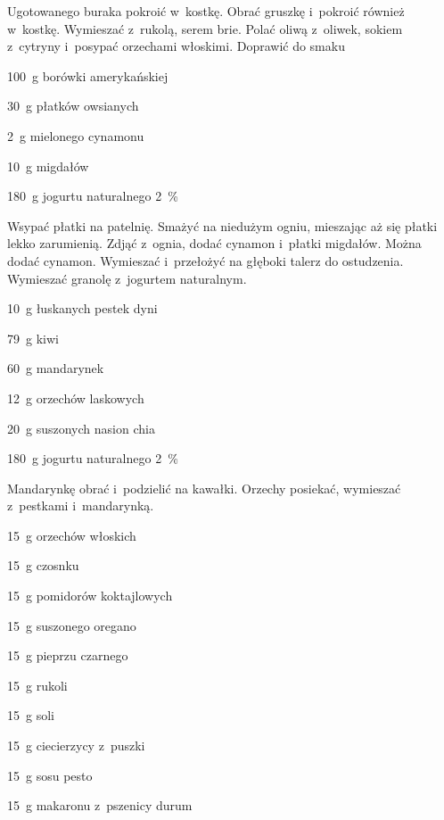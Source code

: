 \documentclass[../main.tex]{subfiles}
\begin{document}
Ugotowanego buraka pokroić w~kostkę. Obrać gruszkę i~pokroić również w~kostkę.
Wymieszać z~rukolą, serem brie. Polać oliwą z~oliwek, sokiem z~cytryny
i~posypać orzechami włoskimi. Doprawić do smaku


\begin{Ingred}
    \item \qty{100}{\gram} borówki amerykańskiej
    \item \qty{30}{\gram} płatków owsianych
    \item \qty{2}{\gram} mielonego cynamonu
    \item \qty{10}{\gram} migdałów
    \item \qty{180}{\gram} jogurtu naturalnego \qty{2}{\percent}
\end{Ingred}

Wsypać płatki na patelnię. Smażyć na niedużym ogniu, mieszając aż się płatki
lekko zarumienią. Zdjąć z~ognia, dodać cynamon i~płatki migdałów. Można dodać
cynamon. Wymieszać i~przełożyć na głęboki talerz do ostudzenia. Wymieszać
granolę z~jogurtem naturalnym.


\begin{Ingred}
    \item \qty{10}{\gram} łuskanych pestek dyni
    \item \qty{79}{\gram} kiwi
    \item \qty{60}{\gram} mandarynek
    \item \qty{12}{\gram} orzechów laskowych
    \item \qty{20}{\gram} suszonych nasion chia
    \item \qty{180}{\gram} jogurtu naturalnego \qty{2}{\percent}
\end{Ingred}

Mandarynkę obrać i~podzielić na kawałki. Orzechy posiekać, wymieszać z~pestkami
i~mandarynką.


\begin{Ingred}
    \item \qty{15}{\gram} orzechów włoskich
    \item \qty{15}{\gram} czosnku
    \item \qty{15}{\gram} pomidorów koktajlowych
    \item \qty{15}{\gram} suszonego oregano
    \item \qty{15}{\gram} pieprzu czarnego
    \item \qty{15}{\gram} rukoli
    \item \qty{15}{\gram} soli
    \item \qty{15}{\gram} ciecierzycy z~puszki
    \item \qty{15}{\gram} sosu pesto
    \item \qty{15}{\gram} makaronu z~pszenicy durum
\end{Ingred}
\end{document}
